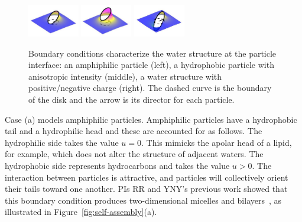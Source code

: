 \begin{figure}
  \vspace{-20pt}
  \begin{center}
  \includegraphics[width=0.2\textwidth]{figures/LPA.jpg}
  \includegraphics[width=0.2\textwidth]{figures/LPB.jpg}
  \includegraphics[width=0.2\textwidth]{figures/LPC.jpg}
  \end{center}
  \vspace{-20pt}  
  \caption{\label{fig:bcs} Boundary conditions characterize the water
    structure at the particle interface: an amphiphilic particle (left),
    a hydrophobic
  particle with anisotropic intensity (middle), a water structure with
  positive/negative charge (right). The dashed curve is the boundary of the
  disk and the arrow is its director for each particle.}
\end{figure}
Case (a) models amphiphilic particles.
Amphiphilic particles have a hydrophobic tail and a hydrophilic head
and these are accounted for as follows.
The hydrophilic side takes the value $u =0$.
This mimicks the apolar head of a lipid, for example, which does
not alter the structure of adjacent waters. The hydrophobic side
represents hydrocarbons and takes the value 
$u > 0$. The interaction between particles is attractive,
and particles will collectively orient their tails toward
one another. 
PIs RR and YNY's previous work showed that this   
boundary condition produces two-dimensional micelles and
bilayers~\cite{Fu2018_SIAM}, as illustrated in 
Figure~\ref{fig:self-assembly}(a).

